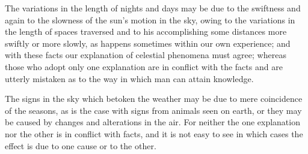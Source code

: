\documentclass{stex}
\begin{document}
The variations in the length of nights and days may be due to the swiftness and again to the slowness of the sun's motion in the sky, owing to the variations in the length of spaces traversed and to his accomplishing some distances more swiftly or more slowly, as happens sometimes within our own experience; and with these facts our explanation of celestial phenomena must agree; whereas those who adopt only one explanation are in conflict with the facts and are utterly mistaken as to the way in which man can attain knowledge.

The signs in the sky which betoken the weather may be due to mere coincidence of the seasons, as is the case with signs from animals seen on earth, or they may be caused by changes and alterations in the air.
For neither the one explanation nor the other is in conflict with facts, and it is not easy to see in which cases the effect is due to one cause or to the other.
\end{document}
